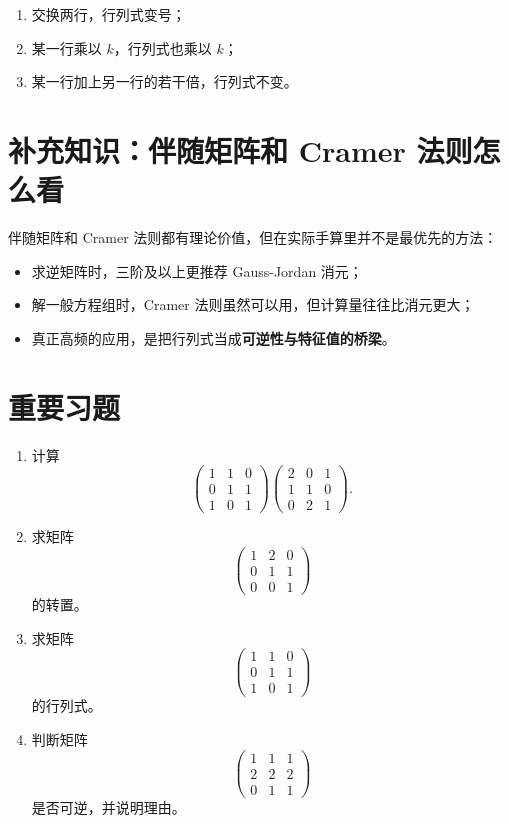\documentclass[11pt,oneside,UTF8]{ctexbook}
\newcommand{\important}[1]{\textcolor{Sakura}{\textbf{#1}}}
\begin{document}
\begin{summarybox}[行列式与行变换的关系]
\begin{enumerate}
  \item 交换两行，行列式变号；
  \item 某一行乘以 \(k\)，行列式也乘以 \(k\)；
  \item 某一行加上另一行的若干倍，行列式不变。
\end{enumerate}
\end{summarybox}

\section{补充知识：伴随矩阵和 Cramer 法则怎么看}

伴随矩阵和 Cramer 法则都有理论价值，但在实际手算里并不是最优先的方法：
\begin{itemize}
  \item 求逆矩阵时，三阶及以上更推荐 Gauss-Jordan 消元；
  \item 解一般方程组时，Cramer 法则虽然可以用，但计算量往往比消元更大；
  \item 真正高频的应用，是把行列式当成\important{可逆性与特征值的桥梁}。
\end{itemize}

\section{重要习题}

\begin{exercisebox}[第 2 章重要习题]
\begin{enumerate}
  \item 计算
  \[
  \begin{pmatrix}
  1&1&0\\
  0&1&1\\
  1&0&1
  \end{pmatrix}
  \begin{pmatrix}
  2&0&1\\
  1&1&0\\
  0&2&1
  \end{pmatrix}.
  \]
  \item 求矩阵
  \[
  \begin{pmatrix}
  1&2&0\\
  0&1&1\\
  0&0&1
  \end{pmatrix}
  \]
  的转置。
  \item 求矩阵
  \[
  \begin{pmatrix}
  1&1&0\\
  0&1&1\\
  1&0&1
  \end{pmatrix}
  \]
  的行列式。
  \item 判断矩阵
  \[
  \begin{pmatrix}
  1&1&1\\
  2&2&2\\
  0&1&1
  \end{pmatrix}
  \]
  是否可逆，并说明理由。
\end{enumerate}
\end{exercisebox}
\end{document}
